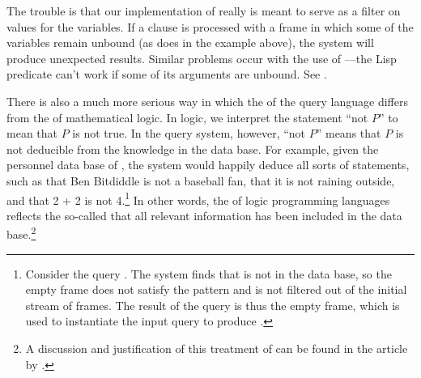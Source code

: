 The trouble is that our implementation of  really is meant to serve
as a filter on values for the variables.  If a  clause is processed
with a frame in which some of the variables remain unbound (as does 
in the example above), the system will produce unexpected results. Similar
problems occur with the use of ---the Lisp predicate can't
work if some of its arguments are unbound.  See .

There is also a much more serious way in which the  of the query
language differs from the  of mathematical logic.  In logic, we
interpret the statement ``not \( P \)'' to mean that \( P \) is not true.  In the
query system, however, ``not \( P \)'' means that \( P \) is not deducible from the
knowledge in the data base.  For example, given the personnel data base of
, the system would happily deduce all sorts of 
statements, such as that Ben Bitdiddle is not a baseball fan, that it is not
raining outside, and that 2 + 2 is not 4.\footnote{Consider the query
.  The system finds that
 is not in the data base, so the empty
frame does not satisfy the pattern and is not filtered out of the initial
stream of frames.  The result of the query is thus the empty frame, which is
used to instantiate the input query to produce .} In other words, the  of logic programming
languages reflects the so-called  that all
relevant information has been included in the data base.\footnote{A discussion
and justification of this treatment of  can be found in the article
by .}

